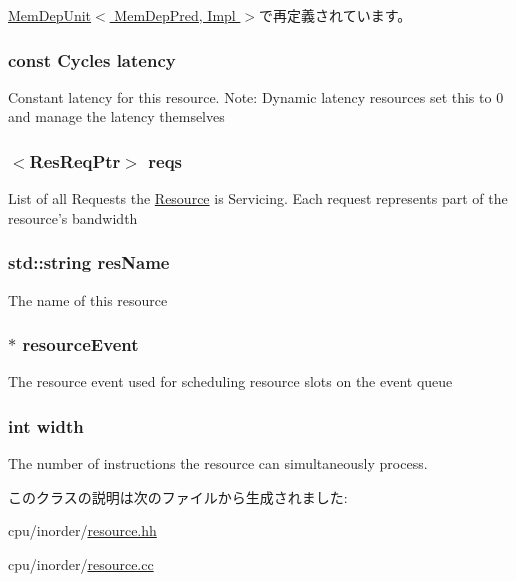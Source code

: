 \hyperlink{classMemDepUnit_a7441ef0865bcb3db9b8064dd7375c1ea}{MemDepUnit$<$ MemDepPred, Impl $>$}で再定義されています。\hypertarget{classResource_a46b9d67ee437c6ecdbedca8ec8d2ed40}{
\subsubsection[{latency}]{\setlength{\rightskip}{0pt plus 5cm}const {\bf Cycles} {\bf latency}}}
\label{classResource_a46b9d67ee437c6ecdbedca8ec8d2ed40}
Constant latency for this resource. Note: Dynamic latency resources set this to 0 and manage the latency themselves \hypertarget{classResource_a83b4e5928b54d2813c3c4911043e677d}{
\subsubsection[{reqs}]{$<${\bf ResReqPtr}$>$ {\bf reqs}}}
\label{classResource_a83b4e5928b54d2813c3c4911043e677d}
List of all Requests the \hyperlink{classResource}{Resource} is Servicing. Each request represents part of the resource's bandwidth \hypertarget{classResource_a991d4c92f58169fd45fe3f1c1881ac9e}{
\subsubsection[{resName}]{\setlength{\rightskip}{0pt plus 5cm}std::string {\bf resName}}}
\label{classResource_a991d4c92f58169fd45fe3f1c1881ac9e}
The name of this resource \hypertarget{classResource_abde7a6c4ff046aa4c2ecd476c4266be3}{
\subsubsection[{resourceEvent}]{$\ast$ {\bf resourceEvent}}}
\label{classResource_abde7a6c4ff046aa4c2ecd476c4266be3}
The resource event used for scheduling resource slots on the event queue \hypertarget{classResource_a2474a5474cbff19523a51eb1de01cda4}{
\subsubsection[{width}]{\setlength{\rightskip}{0pt plus 5cm}int {\bf width}}}
\label{classResource_a2474a5474cbff19523a51eb1de01cda4}
The number of instructions the resource can simultaneously process. 

このクラスの説明は次のファイルから生成されました:\begin{DoxyCompactItemize}
\item 
cpu/inorder/\hyperlink{resource_8hh}{resource.hh}\item 
cpu/inorder/\hyperlink{resource_8cc}{resource.cc}\end{DoxyCompactItemize}
